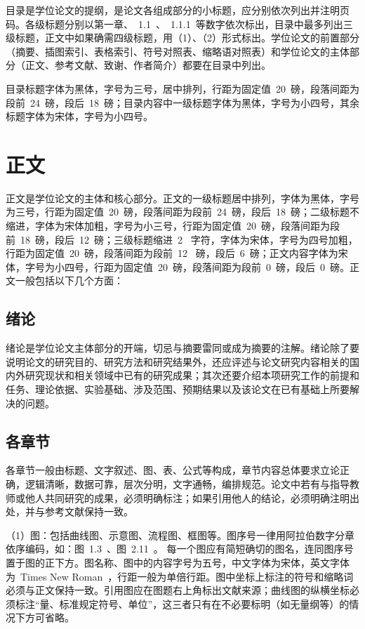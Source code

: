 目录是学位论文的提纲，是论文各组成部分的小标题，应分别依次列出并注明页码。各级标题分别以第一章、~1.1~、~1.1.1~等数字依次标出，目录中最多列出三级标题，正文中如果确需四级标题，用（1）、（2）形式标出。学位论文的前置部分（摘要、插图索引、表格索引、符号对照表、缩略语对照表）和学位论文的主体部分（正文、参考文献、致谢、作者简介）都要在目录中列出。

目录标题字体为黑体，字号为三号，居中排列，行距为固定值~20~磅，段落间距为段前~24~磅，段后~18~磅；目录内容中一级标题字体为黑体，字号为小四号，其余标题字体为宋体，字号为小四号。

\section{正文}

正文是学位论文的主体和核心部分。正文的一级标题居中排列，字体为黑体，字号为三号，行距为固定值~20~磅，段落间距为段前~24~磅，段后~18~磅；二级标题不缩进，字体为宋体加粗，字号为小三号，行距为固定值~20~磅，段落间距为段前~18~磅，段后~12~磅；三级标题缩进~2~ 字符，字体为宋体，字号为四号加粗，行距为固定值~20~磅，段落间距为段前~12~ 磅，段后~6~磅；正文内容字体为宋体，字号为小四号，行距为固定值~20~磅，段落间距为段前~0~磅，段后~0~磅。正文一般包括以下几个方面：

\subsection{绪论}

绪论是学位论文主体部分的开端，切忌与摘要雷同或成为摘要的注解。绪论除了要说明论文的研究目的、研究方法和研究结果外，还应评述与论文研究内容相关的国内外研究现状和相关领域中已有的研究成果；其次还要介绍本项研究工作的前提和任务、理论依据、实验基础、涉及范围、预期结果以及该论文在已有基础上所要解决的问题。

\subsection{各章节}

各章节一般由标题、文字叙述、图、表、公式等构成，章节内容总体要求立论正确，逻辑清晰，数据可靠，层次分明，文字通畅，编排规范。论文中若有与指导教师或他人共同研究的成果，必须明确标注；如果引用他人的结论，必须明确注明出处，并与参考文献保持一致。

（1）图：包括曲线图、示意图、流程图、框图等。图序号一律用阿拉伯数字分章依序编码，如：图~1.3~、图~2.11~。 每一个图应有简短确切的图名，连同图序号置于图的正下方。图名称、图中的内容字号为五号，中文字体为宋体，英文字体为~Times New Roman~，行距一般为单倍行距。图中坐标上标注的符号和缩略词必须与正文保持一致。引用图应在图题右上角标出文献来源；曲线图的纵横坐标必须标注“量、标准规定符号、单位”，这三者只有在不必要标明（如无量纲等）的情况下方可省略。

